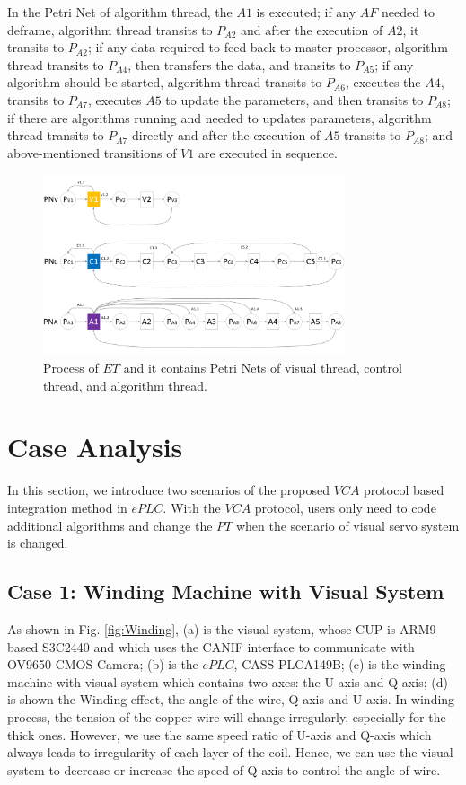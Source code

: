 \documentclass[journal,UTF8]{IEEEtran}
\begin{document}
In the Petri Net of algorithm thread, the $A1$ is executed; if any $AF$ needed to deframe, algorithm thread transits to $P_{A2}$ and after the execution of $A2$, it transits to $P_{A2}$; if any data required to feed back to master processor, algorithm thread transits to $P_{A4}$, then transfers the data, and transits to $P_{A5}$; if any algorithm should be started, algorithm thread transits to $P_{A6}$, executes the $A4$, transits to $P_{A7}$, executes $A5$ to update the parameters, and then transits to $P_{A8}$; if there are algorithms running and needed to updates parameters, algorithm thread transits to $P_{A7}$ directly and after the execution of $A5$ transits to $P_{A8}$; and above-mentioned transitions of $V1$ are executed in sequence.               

\begin{figure}
	\centering
	\includegraphics[width=3.5in]{fig/ThreadExecution.pdf}
	\caption{ Process of $ET$ and it contains Petri Nets of visual thread, control thread, and algorithm thread.}
	\label{fig:threadExecution}
\end{figure}

\section{Case Analysis}
\label{Case}
In this section, we introduce two scenarios of the proposed $VCA$ protocol based integration method in $ePLC$. With the $VCA$ protocol, users only need to code additional algorithms and change the $PT$ when the scenario of visual servo system is changed. 

\subsection{Case 1: Winding Machine with Visual System}
  
As shown in Fig. \ref{fig:Winding}, (a) is the visual system, whose CUP is ARM9 based S3C2440 and which uses the CANIF interface to communicate with OV9650 CMOS Camera; (b) is the $ePLC$, CASS-PLCA149B; (c) is the winding machine with visual system which contains two axes: the U-axis and Q-axis; (d) is shown the Winding effect, the angle of the wire, Q-axis and U-axis. In winding process, the tension of the copper wire will change irregularly, especially for the thick ones. However, we use the same speed ratio of U-axis and Q-axis which always leads to irregularity of each layer of the coil. Hence, we can use the visual system to decrease or increase the speed of Q-axis to control the angle of wire. 
\end{document}
